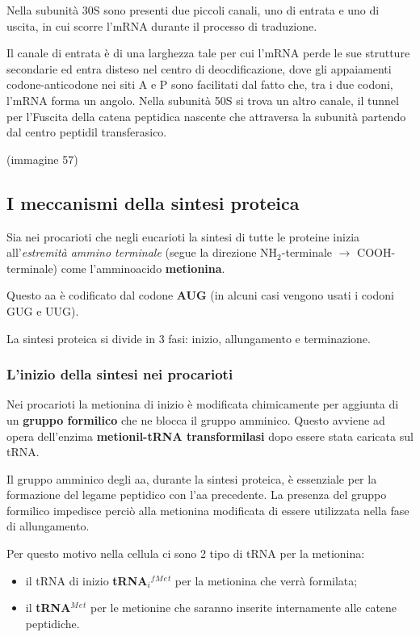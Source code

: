 \documentclass[]{article}
\begin{document}
Nella subunità 30S sono presenti due piccoli canali, uno di entrata e
uno di uscita, in cui scorre l'mRNA durante il processo di traduzione.

Il canale di entrata è di una larghezza tale per cui l'mRNA perde le sue
strutture secondarie ed entra disteso nel centro di deocdificazione,
dove gli appaiamenti codone-anticodone nei siti A e P sono facilitati
dal fatto che, tra i due codoni, l'mRNA forma un angolo. Nella subunità
50S si trova un altro canale, il tunnel per l'Fuscita della catena
peptidica nascente che attraversa la subunità partendo dal centro
peptidil transferasico.

(immagine 57)

\subsection{I meccanismi della sintesi
proteica}\label{i-meccanismi-della-sintesi-proteica}

Sia nei procarioti che negli eucarioti la sintesi di tutte le proteine
inizia all'\emph{estremità ammino terminale} (segue la direzione
NH\(_2\)-terminale \(\rightarrow\) COOH-terminale) come l'amminoacido
\textbf{metionina}.

Questo aa è codificato dal codone \textbf{AUG} (in alcuni casi vengono
usati i codoni GUG e UUG).

La sintesi proteica si divide in 3 fasi: inizio, allungamento e
terminazione.

\subsubsection{L'inizio della sintesi nei
procarioti}\label{linizio-della-sintesi-nei-procarioti}

Nei procarioti la metionina di inizio è modificata chimicamente per
aggiunta di un \textbf{gruppo formilico} che ne blocca il gruppo
amminico. Questo avviene ad opera dell'enzima \textbf{metionil-tRNA
transformilasi} dopo essere stata caricata sul tRNA.

Il gruppo amminico degli aa, durante la sintesi proteica, è essenziale
per la formazione del legame peptidico con l'aa precedente. La presenza
del gruppo formilico impedisce perciò alla metionina modificata di
essere utilizzata nella fase di allungamento.

Per questo motivo nella cellula ci sono 2 tipo di tRNA per la metionina:

\begin{itemize}
\itemsep1pt\parskip0pt
\item
  il tRNA di inizio \textbf{tRNA\(_i\)\(^f\)\(^M\)\(^e\)\(^t\)} per la
  metionina che verrà formilata;
\item
  il \textbf{tRNA\(^M\)\(^e\)\(^t\)} per le metionine che saranno
  inserite internamente alle catene peptidiche.
\end{itemize}
\end{document}
